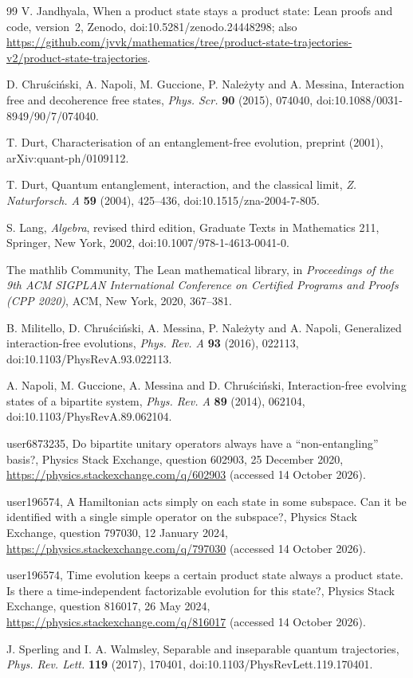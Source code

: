 \documentclass[11pt]{article}
\theoremstyle{remark}
\begin{document}
\begin{thebibliography}{99}
V. Jandhyala, When a product state stays a product state: Lean proofs and code, version~2,
Zenodo, doi:10.5281/zenodo.24448298; also
\url{https://github.com/jvvk/mathematics/tree/product-state-trajectories-v2/product-state-trajectories}.

D. Chru\'sci\'nski, A. Napoli, M. Guccione, P. Nale\.zyty and A. Messina, Interaction free
and decoherence free states, \emph{Phys. Scr.} \textbf{90} (2015), 074040,
doi:10.1088/0031-8949/90/7/074040.

T. Durt, Characterisation of an entanglement-free evolution, preprint (2001),
arXiv:quant-ph/0109112.

T. Durt, Quantum entanglement, interaction, and the classical limit, \emph{Z. Naturforsch. A}
\textbf{59} (2004), 425--436, doi:10.1515/zna-2004-7-805.

S. Lang, \emph{Algebra}, revised third edition, Graduate Texts in Mathematics 211, Springer,
New York, 2002, doi:10.1007/978-1-4613-0041-0.

The mathlib Community, The Lean mathematical library, in \emph{Proceedings of the 9th ACM
SIGPLAN International Conference on Certified Programs and Proofs (CPP 2020)}, ACM, New
York, 2020, 367--381.

B. Militello, D. Chru\'sci\'nski, A. Messina, P. Nale\.zyty and A. Napoli, Generalized
interaction-free evolutions, \emph{Phys. Rev. A} \textbf{93} (2016), 022113,
doi:10.1103/PhysRevA.93.022113.

A. Napoli, M. Guccione, A. Messina and D. Chru\'sci\'nski, Interaction-free evolving states of a
bipartite system, \emph{Phys. Rev. A} \textbf{89} (2014), 062104,
doi:10.1103/PhysRevA.89.062104.

user6873235, Do bipartite unitary operators always have a ``non-entangling'' basis?, Physics
Stack Exchange, question 602903, 25 December 2020,
\url{https://physics.stackexchange.com/q/602903} (accessed 14 October 2026).

user196574, A Hamiltonian acts simply on each state in some subspace. Can it be identified with
a single simple operator on the subspace?, Physics Stack Exchange, question 797030, 12 January
2024, \url{https://physics.stackexchange.com/q/797030} (accessed 14 October 2026).

user196574, Time evolution keeps a certain product state always a product state. Is there a
time-independent factorizable evolution for this state?, Physics Stack Exchange, question
816017, 26 May 2024, \url{https://physics.stackexchange.com/q/816017} (accessed 14 October
2026).

J. Sperling and I. A. Walmsley, Separable and inseparable quantum trajectories, \emph{Phys.
Rev. Lett.} \textbf{119} (2017), 170401, doi:10.1103/PhysRevLett.119.170401.
\end{thebibliography}
\end{document}
